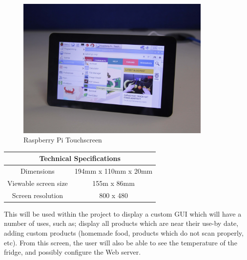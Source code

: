 \documentclass[10pt]{article}
\begin{document}
\begin{figure}[h]
\centering
\caption{Raspberry Pi Touchscreen}
\label{Raspberry Pi Touchscreen}
\includegraphics[height=7cm]{images/pi-touchscreen.jpg}
\end{figure}

\begin{center}
	\begin{tabular}{ | c | c | }
		\hline
	 	\multicolumn{2}{|c|}{Technical Specifications} \\ \hline
		Dimensions 		& 194mm x 110mm x 20mm \\ \hline
		Viewable screen size 	& 155m x 86mm \\ \hline
		Screen resolution	& 800 x 480 \\ \hline
	\end{tabular}
\end{center}

This will be used within the project to display a custom GUI which will have a number of uses, such as; display all products which are near their use-by date, adding custom products (homemade food, products which do not scan properly, etc). From this screen, the user will also be able to see the temperature of the fridge, and possibly configure the Web server.
\end{document}
